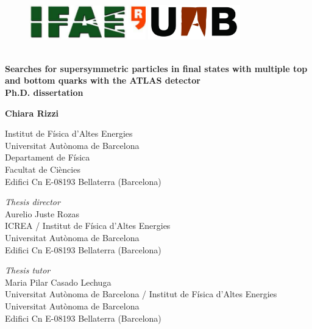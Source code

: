\begin{titlepage}
\begin{center}

\begin{figure}[h!]
\includegraphics[height=15mm]{figures/front/IFAE_logo-eps-converted-to.pdf}
\hfill
\includegraphics[height=15mm]{figures/front/uab_logo-eps-converted-to.pdf}
\end{figure}
 
\vspace{0.5cm}
\HRule\\
\vspace{0.2cm}
{\huge \bf Searches for supersymmetric particles in final states with multiple top and bottom quarks with the ATLAS detector\\
\vspace{1cm}
Ph.D. dissertation}
\HRule\\
\par
\vspace{1.5in}
 
{\LARGE \bf Chiara Rizzi}
\vspace{0.3cm}
\par
Institut de F\'{i}sica d'Altes Energies\\
Universitat Aut\`{o}noma de Barcelona\\
Departament de F\'{i}sica\\
Facultat de Ci\`{e}ncies \\
Edifici Cn E-08193 Bellaterra (Barcelona)
\par
\vspace{0.5in}
 
 
\vfill
{\it Thesis director}\\
Aurelio Juste Rozas\\
ICREA / Institut de F\'{i}sica d'Altes Energies\\
Universitat Aut\`{o}noma de Barcelona\\
Edifici Cn E-08193 Bellaterra (Barcelona)

\vfill
{\it Thesis tutor}\\
Maria Pilar Casado Lechuga\\
Universitat Aut\`{o}noma de Barcelona / Institut de F\'{i}sica d'Altes Energies\\
Universitat Aut\`{o}noma de Barcelona\\
Edifici Cn E-08193 Bellaterra (Barcelona)

\end{center}
\end{titlepage}
